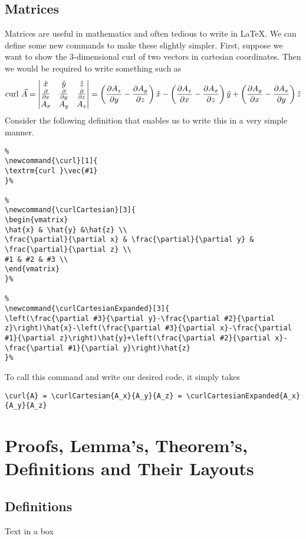 \documentclass[11pt]{article}
\begin{document}
\subsection{Matrices}
Matrices are useful in mathematics and often tedious to write in \LaTeX. We can define some new commands to make these slightly simpler. First, suppose we want to show the 3-dimensional curl of two vectors in cartesian coordinates. Then we would be required to write something such as
\begin{align}
\curl{A} = \curlCartesian{A_x}{A_y}{A_z} = \curlCartesianExpanded{A_x}{A_y}{A_z}
\end{align}
Consider the following definition that enables us to write this in a very simple manner.
\begin{lstlisting}
%
\newcommand{\curl}[1]{
\textrm{curl }\vec{#1}
}%

%
\newcommand{\curlCartesian}[3]{
\begin{vmatrix}
\hat{x} & \hat{y} &\hat{z} \\
\frac{\partial}{\partial x} & \frac{\partial}{\partial y} & \frac{\partial}{\partial z} \\
#1 & #2 & #3 \\
\end{vmatrix}
}%

%
\newcommand{\curlCartesianExpanded}[3]{
\left(\frac{\partial #3}{\partial y}-\frac{\partial #2}{\partial z}\right)\hat{x}-\left(\frac{\partial #3}{\partial x}-\frac{\partial #1}{\partial z}\right)\hat{y}+\left(\frac{\partial #2}{\partial x}-\frac{\partial #1}{\partial y}\right)\hat{z}
}%
\end{lstlisting}
To call this command and write our desired code, it simply takes
\begin{lstlisting}
\curl{A} = \curlCartesian{A_x}{A_y}{A_z} = \curlCartesianExpanded{A_x}{A_y}{A_z}
\end{lstlisting}



\section{Proofs, Lemma's, Theorem's, Definitions and Their Layouts}

\subsection{Definitions}

\begin{fancybox}[Definition]{2}
	Text in a box
\end{fancybox}
\end{document}
